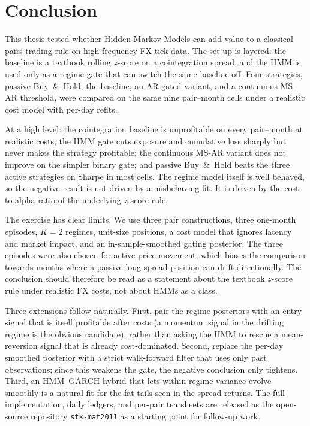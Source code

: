 \section{Conclusion}\label{sec:conclusion}

This thesis tested whether Hidden Markov Models can add value to a classical pairs-trading rule on high-frequency FX tick data. The set-up is layered: the baseline is a textbook rolling $z$-score on a cointegration spread, and the HMM is used only as a regime gate that can switch the same baseline off. Four strategies, passive Buy~\&~Hold, the baseline, an AR-gated variant, and a continuous MS-AR threshold, were compared on the same nine pair--month cells under a realistic cost model with per-day refits.

At a high level: the cointegration baseline is unprofitable on every pair--month at realistic costs; the HMM gate cuts exposure and cumulative loss sharply but never makes the strategy profitable; the continuous MS-AR variant does not improve on the simpler binary gate; and passive Buy~\&~Hold beats the three active strategies on Sharpe in most cells. The regime model itself is well behaved, so the negative result is not driven by a misbehaving fit. It is driven by the cost-to-alpha ratio of the underlying $z$-score rule.

The exercise has clear limits. We use three pair constructions, three one-month episodes, $K = 2$ regimes, unit-size positions, a cost model that ignores latency and market impact, and an in-sample-smoothed gating posterior. The three episodes were also chosen for active price movement, which biases the comparison towards months where a passive long-spread position can drift directionally. The conclusion should therefore be read as a statement about the textbook $z$-score rule under realistic FX costs, not about HMMs as a class.

Three extensions follow naturally. First, pair the regime posteriors with an entry signal that is itself profitable after costs (a momentum signal in the drifting regime is the obvious candidate), rather than asking the HMM to rescue a mean-reversion signal that is already cost-dominated. Second, replace the per-day smoothed posterior with a strict walk-forward filter that uses only past observations; since this weakens the gate, the negative conclusion only tightens. Third, an HMM--GARCH hybrid that lets within-regime variance evolve smoothly is a natural fit for the fat tails seen in the spread returns. The full implementation, daily ledgers, and per-pair tearsheets are released as the open-source repository \texttt{stk-mat2011} as a starting point for follow-up work.
